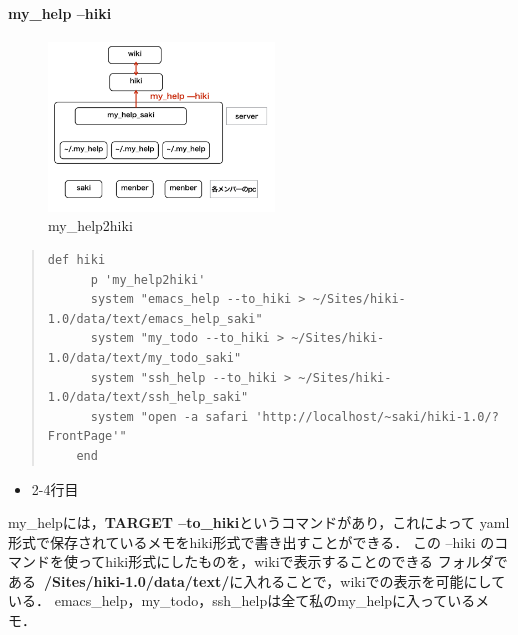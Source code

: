 \paragraph{my\_help --hiki}

\begin{figure}[htbp]\begin{center}
\includegraphics[width=6cm,bb=100 100 600 700]{my_help2hiki_saki.013.png}
\caption{my\_help2hiki}
\label{default}\end{center}\end{figure}


\begin{quote}\begin{verbatim}
def hiki
      p 'my_help2hiki'
      system "emacs_help --to_hiki > ~/Sites/hiki-1.0/data/text/emacs_help_saki"
      system "my_todo --to_hiki > ~/Sites/hiki-1.0/data/text/my_todo_saki"
      system "ssh_help --to_hiki > ~/Sites/hiki-1.0/data/text/ssh_help_saki"
      system "open -a safari 'http://localhost/~saki/hiki-1.0/?FrontPage'"
    end
\end{verbatim}\end{quote}
\begin{itemize}
\item 2-4行目
\end{itemize}
\begin{description}
\item my\_helpには，\textbf{TARGET --to\_hiki}というコマンドがあり，これによって
yaml形式で保存されているメモをhiki形式で書き出すことができる．
この --hiki のコマンドを使ってhiki形式にしたものを，wikiで表示することのできる
フォルダである\textbf{~/Sites/hiki-1.0/data/text/}に入れることで，wikiでの表示を可能にしている．
emacs\_help，my\_todo，ssh\_helpは全て私のmy\_helpに入っているメモ．
\end{description}

